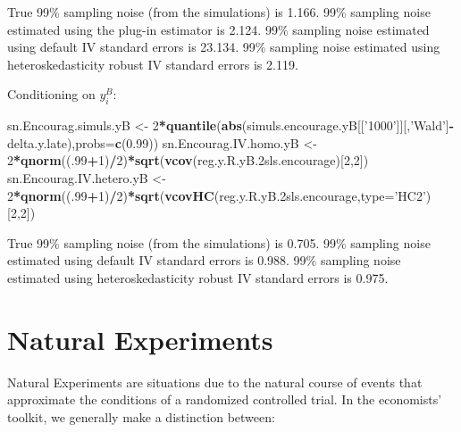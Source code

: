 \documentclass[]{book}
\newenvironment{Shaded}{\begin{snugshade}}{\end{snugshade}}
\newcommand{\DataTypeTok}[1]{\textcolor[rgb]{0.13,0.29,0.53}{#1}}
\newcommand{\DecValTok}[1]{\textcolor[rgb]{0.00,0.00,0.81}{#1}}
\newcommand{\FloatTok}[1]{\textcolor[rgb]{0.00,0.00,0.81}{#1}}
\newcommand{\KeywordTok}[1]{\textcolor[rgb]{0.13,0.29,0.53}{\textbf{#1}}}
\newcommand{\NormalTok}[1]{#1}
\newcommand{\OperatorTok}[1]{\textcolor[rgb]{0.81,0.36,0.00}{\textbf{#1}}}
\newcommand{\StringTok}[1]{\textcolor[rgb]{0.31,0.60,0.02}{#1}}
\theoremstyle{definition}
\theoremstyle{definition}
\theoremstyle{definition}
\theoremstyle{remark}
\begin{document}
True 99\% sampling noise (from the simulations) is 1.166.
99\% sampling noise estimated using the plug-in estimator is 2.124.
99\% sampling noise estimated using default IV standard errors is 23.134.
99\% sampling noise estimated using heteroskedasticity robust IV standard errors is 2.119.

Conditioning on \(y_i^B\):

\begin{Shaded}
\begin{Highlighting}[]
\NormalTok{sn.Encourag.simuls.yB <-}\StringTok{ }\DecValTok{2}\OperatorTok{*}\KeywordTok{quantile}\NormalTok{(}\KeywordTok{abs}\NormalTok{(simuls.encourage.yB[[}\StringTok{'1000'}\NormalTok{]][,}\StringTok{'Wald'}\NormalTok{]}\OperatorTok{-}\NormalTok{delta.y.late),}\DataTypeTok{probs=}\KeywordTok{c}\NormalTok{(}\FloatTok{0.99}\NormalTok{))}
\NormalTok{sn.Encourag.IV.homo.yB <-}\StringTok{ }\DecValTok{2}\OperatorTok{*}\KeywordTok{qnorm}\NormalTok{((.}\DecValTok{99}\OperatorTok{+}\DecValTok{1}\NormalTok{)}\OperatorTok{/}\DecValTok{2}\NormalTok{)}\OperatorTok{*}\KeywordTok{sqrt}\NormalTok{(}\KeywordTok{vcov}\NormalTok{(reg.y.R.yB}\FloatTok{.2}\NormalTok{sls.encourage)[}\DecValTok{2}\NormalTok{,}\DecValTok{2}\NormalTok{])}
\NormalTok{sn.Encourag.IV.hetero.yB <-}\StringTok{ }\DecValTok{2}\OperatorTok{*}\KeywordTok{qnorm}\NormalTok{((.}\DecValTok{99}\OperatorTok{+}\DecValTok{1}\NormalTok{)}\OperatorTok{/}\DecValTok{2}\NormalTok{)}\OperatorTok{*}\KeywordTok{sqrt}\NormalTok{(}\KeywordTok{vcovHC}\NormalTok{(reg.y.R.yB}\FloatTok{.2}\NormalTok{sls.encourage,}\DataTypeTok{type=}\StringTok{'HC2'}\NormalTok{)[}\DecValTok{2}\NormalTok{,}\DecValTok{2}\NormalTok{])}
\end{Highlighting}
\end{Shaded}

True 99\% sampling noise (from the simulations) is 0.705.
99\% sampling noise estimated using default IV standard errors is 0.988.
99\% sampling noise estimated using heteroskedasticity robust IV standard errors is 0.975.

\hypertarget{NE}{%
\chapter{Natural Experiments}\label{NE}}

Natural Experiments are situations due to the natural course of events that approximate the conditions of a randomized controlled trial.
In the economists' toolkit, we generally make a distinction between:
\end{document}
